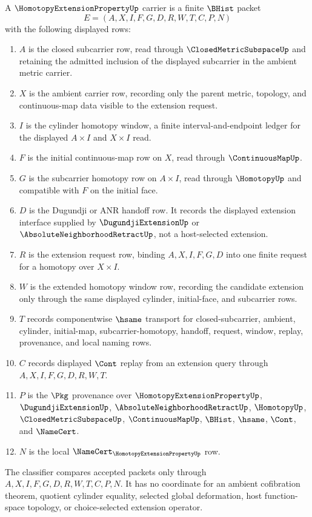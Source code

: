 \begin{definition}
\label{def:homotopy-extension-property-carrier}
A $\HomotopyExtensionPropertyUp$ carrier is a finite $\BHist$ packet
$$
E=(A,X,I,F,G,D,R,W,T,C,P,N)
$$
with the following displayed rows:
\begin{enumerate}
\item $A$ is the closed subcarrier row, read through $\ClosedMetricSubspaceUp$ and retaining the admitted inclusion of the displayed subcarrier in the ambient metric carrier.
\item $X$ is the ambient carrier row, recording only the parent metric, topology, and continuous-map data visible to the extension request.
\item $I$ is the cylinder homotopy window, a finite interval-and-endpoint ledger for the displayed $A \times I$ and $X \times I$ read.
\item $F$ is the initial continuous-map row on $X$, read through $\ContinuousMapUp$.
\item $G$ is the subcarrier homotopy row on $A \times I$, read through $\HomotopyUp$ and compatible with $F$ on the initial face.
\item $D$ is the Dugundji or ANR handoff row. It records the displayed extension interface supplied by $\DugundjiExtensionUp$ or $\AbsoluteNeighborhoodRetractUp$, not a host-selected extension.
\item $R$ is the extension request row, binding $A,X,I,F,G,D$ into one finite request for a homotopy over $X \times I$.
\item $W$ is the extended homotopy window row, recording the candidate extension only through the same displayed cylinder, initial-face, and subcarrier rows.
\item $T$ records componentwise $\hsame$ transport for closed-subcarrier, ambient, cylinder, initial-map, subcarrier-homotopy, handoff, request, window, replay, provenance, and local naming rows.
\item $C$ records displayed $\Cont$ replay from an extension query through $A,X,I,F,G,D,R,W,T$.
\item $P$ is the $\Pkg$ provenance over $\HomotopyExtensionPropertyUp$, $\DugundjiExtensionUp$, $\AbsoluteNeighborhoodRetractUp$, $\HomotopyUp$, $\ClosedMetricSubspaceUp$, $\ContinuousMapUp$, $\BHist$, $\hsame$, $\Cont$, and $\NameCert$.
\item $N$ is the local $\NameCert_{\HomotopyExtensionPropertyUp}$ row.
\end{enumerate}
The classifier compares accepted packets only through $A,X,I,F,G,D,R,W,T,C,P,N$. It has no coordinate for an ambient cofibration theorem, quotient cylinder equality, selected global deformation, host function-space topology, or choice-selected extension operator.
\end{definition}


